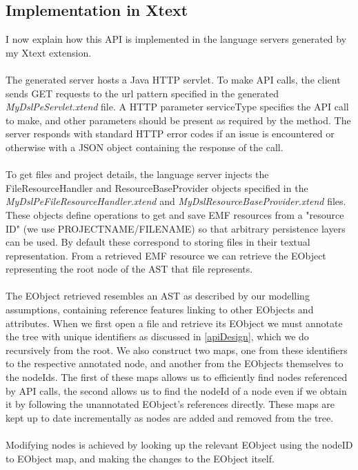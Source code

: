 \documentclass{article}
\begin{document}
{\subsection{Implementation in Xtext}
I now explain how this API is implemented in the language servers generated by my Xtext extension.
\\
\\
The generated server hosts a Java HTTP servlet. To make API calls, the client sends GET requests to the url pattern specified in the generated \emph{MyDslPeServlet.xtend} file. A HTTP parameter serviceType specifies the API call to make, and other parameters should be present as required by the method. The server responds with standard HTTP error codes if an issue is encountered or otherwise with a JSON object containing the response of the call.
\\
\\
To get files and project details, the language server injects the FileResourceHandler and ResourceBaseProvider objects specified in the \emph{MyDslPeFileResourceHandler.xtend} and \emph{MyDslResourceBaseProvider.xtend} files. These objects define operations to get and save EMF resources from a "resource ID" (we use PROJECTNAME/FILENAME) so that arbitrary persistence layers can be used. By default these correspond to storing files in their textual representation. From a retrieved EMF resource we can retrieve the EObject representing the root node of the AST that file represents.
\\
\\
The EObject retrieved resembles an AST as described by our modelling assumptions, containing reference features linking to other EObjects and attributes. When we first open a file and retrieve its EObject we must annotate the tree with unique identifiers as discussed in \ref{apiDesign}, which we do recursively from the root. We also construct two maps, one from these identifiers to the respective annotated node, and another from the EObjects themselves to the nodeIds. The first of these maps allows us to efficiently find nodes referenced by API calls, the second allows us to find the nodeId of a node even if we obtain it by following the unannotated EObject's references directly. These maps are kept up to date incrementally as nodes are added and removed from the tree.
\\
\\
Modifying nodes is achieved by looking up the relevant EObject using the nodeID to EObject map, and making the changes to the EObject itself.
}
\end{document}

